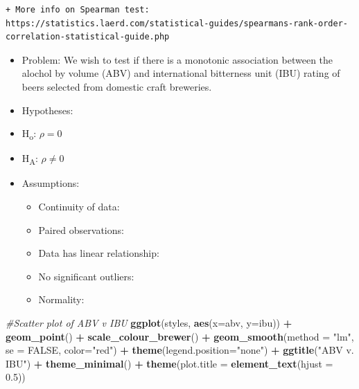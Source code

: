 \documentclass[]{article}
\newenvironment{Shaded}{\begin{snugshade}}{\end{snugshade}}
\newcommand{\KeywordTok}[1]{\textcolor[rgb]{0.13,0.29,0.53}{\textbf{#1}}}
\newcommand{\DataTypeTok}[1]{\textcolor[rgb]{0.13,0.29,0.53}{#1}}
\newcommand{\FloatTok}[1]{\textcolor[rgb]{0.00,0.00,0.81}{#1}}
\newcommand{\StringTok}[1]{\textcolor[rgb]{0.31,0.60,0.02}{#1}}
\newcommand{\CommentTok}[1]{\textcolor[rgb]{0.56,0.35,0.01}{\textit{#1}}}
\newcommand{\OtherTok}[1]{\textcolor[rgb]{0.56,0.35,0.01}{#1}}
\newcommand{\OperatorTok}[1]{\textcolor[rgb]{0.81,0.36,0.00}{\textbf{#1}}}
\newcommand{\NormalTok}[1]{#1}
\providecommand{\tightlist}{%
  \setlength{\itemsep}{0pt}\setlength{\parskip}{0pt}}
\newcommand{\cmark}{\Large\textcolor{green}{\ding{52}}}
\newcommand{\xmark}{\Large\textcolor{red}{\ding{55}}}
\begin{document}
\begin{verbatim}
+ More info on Spearman test: https://statistics.laerd.com/statistical-guides/spearmans-rank-order-correlation-statistical-guide.php
\end{verbatim}

\begin{itemize}
\item
  Problem: We wish to test if there is a monotonic association between
  the alochol by volume (ABV) and international bitterness unit (IBU)
  rating of beers selected from domestic craft breweries.
\item
  Hypotheses:
\item
  H\textsubscript{o}: \(\rho= 0\)
\item
  H\textsubscript{A}: \(\rho\neq 0\)
\item
  Assumptions:

  \begin{itemize}
  \tightlist
  \item
    Continuity of data: \cmark
  \item
    Paired observations: \cmark
  \item
    Data has linear relationship: \cmark
  \item
    No significant outliers: \xmark
  \item
    Normality: \xmark
  \end{itemize}
\end{itemize}

\begin{Shaded}
\begin{Highlighting}[]
\CommentTok{#Scatter plot of ABV v IBU}
\KeywordTok{ggplot}\NormalTok{(styles, }\KeywordTok{aes}\NormalTok{(}\DataTypeTok{x=}\NormalTok{abv, }\DataTypeTok{y=}\NormalTok{ibu)) }\OperatorTok{+}
\StringTok{  }\KeywordTok{geom_point}\NormalTok{() }\OperatorTok{+}
\StringTok{  }\KeywordTok{scale_colour_brewer}\NormalTok{() }\OperatorTok{+}
\StringTok{  }\KeywordTok{geom_smooth}\NormalTok{(}\DataTypeTok{method =} \StringTok{"lm"}\NormalTok{, }\DataTypeTok{se =} \OtherTok{FALSE}\NormalTok{, }\DataTypeTok{color=}\StringTok{"red"}\NormalTok{) }\OperatorTok{+}
\StringTok{  }\KeywordTok{theme}\NormalTok{(}\DataTypeTok{legend.position=}\StringTok{"none"}\NormalTok{) }\OperatorTok{+}
\StringTok{  }\KeywordTok{ggtitle}\NormalTok{(}\StringTok{"ABV v. IBU"}\NormalTok{) }\OperatorTok{+}
\StringTok{  }\KeywordTok{theme_minimal}\NormalTok{()  }\OperatorTok{+}
\StringTok{  }\KeywordTok{theme}\NormalTok{(}\DataTypeTok{plot.title =} \KeywordTok{element_text}\NormalTok{(}\DataTypeTok{hjust =} \FloatTok{0.5}\NormalTok{))}
\end{Highlighting}
\end{Shaded}
\end{document}
